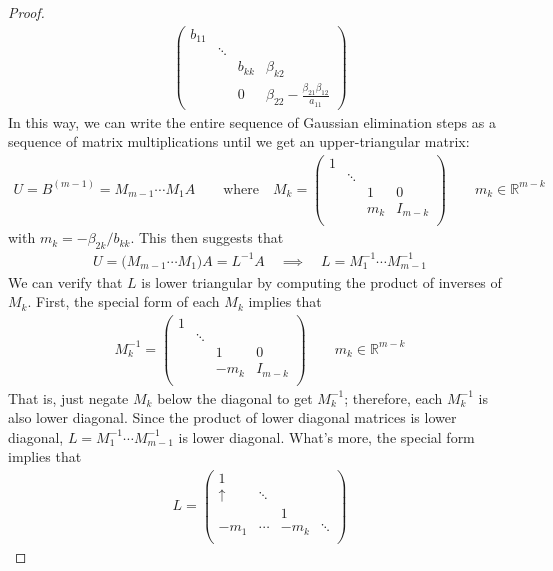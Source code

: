 \documentclass[12pt]{article}
\numberwithin{equation}{section} %
\theoremstyle{plain}
\theoremstyle{definition}
\theoremstyle{remark}
\newcommand{\R}{\mathbb{R}}
\begin{document}
\begin{proof}
\begin{align*}
\begin{pmatrix}
    b_{11} & \\
    & \ddots &  & \\
    & & b_{kk} & \beta_{k2}  \\
    & & 0 & \beta_{22}
      - \frac{\beta_{21}\beta_{12}}{a_{11}}
  \end{pmatrix}
\end{align*}
In this way, we can write the entire sequence of Gaussian elimination
steps as a sequence of matrix multiplications until we get an
upper-triangular matrix:
\begin{align*}
  U = B^{(m-1)} = M_{m-1}\cdots M_1 A
  \qquad
  \text{where}\quad
  M_k
  =
  \begin{pmatrix}
    1 & &\\
    & \ddots &\\
    & & 1 & 0\\
    & & m_k & I_{m-k} \\
  \end{pmatrix}
  \qquad m_k \in\R^{m-k}
\end{align*}
with $m_k = -\beta_{2k}/b_{kk}$.
This then suggests that
\begin{align*}
  U = \big(M_{m-1}\cdots M_1\big)A
  = L^{-1} A
  \quad\implies\quad
  L = M_1^{-1}\cdots M_{m-1}^{-1}
\end{align*}
We can verify that $L$ is lower triangular by computing the product of
inverses of $M_k$. First, the special form of each $M_k$ implies that
\begin{align*}
  M_k^{-1} =
  \begin{pmatrix}
    1 & &\\
    & \ddots &\\
    & & 1 & 0\\
    & & -m_k &I_{m-k} \\
  \end{pmatrix}
  \qquad m_k \in\R^{m-k}
\end{align*}
That is, just negate $M_k$ below the diagonal to get $M_{k}^{-1}$;
therefore, each $M_k^{-1}$ is also lower diagonal. Since the product of
lower diagonal matrices is lower diagonal,
$L=M_1^{-1}\cdots M_{m-1}^{-1}$ is lower diagonal. What's more, the
special form implies that
\begin{align*}
  L=
  \begin{pmatrix}
    1 & &\\
    \uparrow& \ddots &\\
     & & 1 \\
    -m_1 & \cdots & -m_k &\ddots \\

\end{pmatrix}
\end{align*}
\end{proof}
\end{document}

